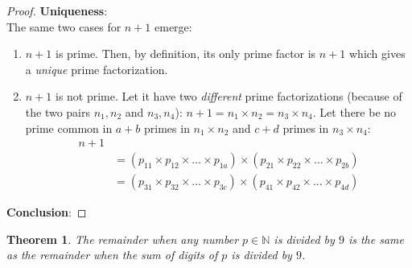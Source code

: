 \documentclass[a4paper]{article}
\newtheorem{theorem}{Theorem}
\begin{document}
\begin{proof}
 \noindent\textbf{Uniqueness}:\\
    The same two cases for $n+1$ emerge:
    \begin{enumerate}
        \item $n+1$ is prime. Then, by definition, its only prime factor is $n+1$ which gives a \emph{unique} prime factorization. 
        \item $n+1$ is not prime. Let it have two \emph{different} prime factorizations (because of the two pairs $n_1, n_2$ and $n_3, n_4$): $n+1 = n_1\times n_2 = n_3\times n_4$. 
             Let there be no prime common in $a+b$ primes in $n_1\times n_2$ and $c+d$ primes in $n_3\times n_4$:
             \begin{align*}
                n + 1\\
             &= (p_{11}\times p_{12}\times \dots \times p_{1a}) \times
                (p_{21}\times p_{22}\times \dots \times p_{2b})\\
             &= (p_{31}\times p_{32}\times \dots \times p_{3c}) \times
                (p_{41}\times p_{42}\times \dots \times p_{4d})
            \end{align*}
    \end{enumerate}

\noindent\textbf{Conclusion}:
\end{proof}
\begin{theorem}
    \label{theorem: div-by-9}
    The remainder when any number $p \in \mathbb{N}$ is divided by $9$ is the same as the remainder when the sum of digits of $p$ is divided by $9$.
\end{theorem}
\end{document}
